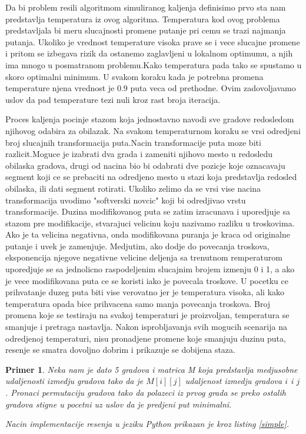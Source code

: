 \documentclass[a4paper]{article}
\newtheorem{primer}{Primer}[section]
\begin{document}
Da bi problem resili algoritmom simuliranog kaljenja definisimo prvo sta nam predstavlja temperatura iz ovog algoritma. Temperatura kod ovog problema predstavljala bi meru slucajnosti promene putanje pri cemu se trazi najmanja putanja. Ukoliko je vrednost temperature visoka prave se i vece slucajne promene i pritom se izbegava rizik da ostanemo zaglavljeni u lokalnom optimumu, a njih ima mnogo u posmatranom problemu.Kako temperatura pada tako se spustamo u skoro optimalni minimum. U svakom koraku kada je potrebna promena temperature njena vrednost je 0.9 puta veca od prethodne. Ovim zadovoljavamo uslov da pad temperature tezi nuli kroz rast broja iteracija.\par

Proces kaljenja pocinje stazom koja jednostavno navodi sve gradove redosledom njihovog odabira za obilazak. Na svakom temperaturnom koraku se vrsi odredjeni broj slucajnih transformacija puta.Nacin transformacije puta moze biti razlicit.Moguce je izabrati dva grada i zameniti njihovo mesto u redosledu obilaska gradova, drugi od nacina bio bi odabrati dve pozicje koje oznacavaju segment koji ce se prebaciti na odredjeno mesto u stazi koja predstavlja redosled obilaska, ili dati segment rotirati. Ukoliko zelimo da se vrsi vise nacina transformacija uvodimo "softverski novcic" koji bi odredjivao vrstu transformacije. 
 Duzina modifikovanog puta se zatim izracunava i uporedjuje sa stazom pre modifikacije, stvarajuci velicinu koju nazivamo razliku u troskovima. Ako je ta velicina negativna, onda modifikovana puranja je kraca od originalne putanje i uvek je zamenjuje. Medjutim, ako dodje do povecanja troskova, eksponencija njegove negativne velicine deljenja sa trenutnom remperaturom uporedjuje se sa jednolicno raspodeljenim slucajnim brojem izmenju 0 i 1, a ako je vece modifikovana puta ce se koristi iako je povecala troskove. U pocetku ce prihvatanje duzeg puta biti vise verovatno jer je temperatura visoka, ali kako temperatura opada bice prihvacena samo manja povecanja troskova. Broj promena koje se testiraju na svakoj temperaturi je proizvoljan, temperatura se smanjuje i pretraga nastavlja. Nakon isprobljavanja svih mogucih scenarija na odredjenoj temperaturi, nisu pronadjene promene koje smanjuju duzinu puta, resenje se smatra dovoljno dobrim i prikazuje se dobijena staza.

\begin{primer}
Neka nam je dato 5 gradova i matrica M koja predstavlja medjusobne udaljenosti izmedju gradova tako da je $M[i][j]$ udaljenost izmedju gradova $i$ i $j$. Pronaci permutaciju gradova tako da polazeci iz prvog grada se preko ostalih gradova stigne u pocetni uz uslov da je predjeni put minimalni.\par
Nacin implementacije resenja u jeziku Python prikazan je kroz listing \ref{simple}. 
\end{primer}
\end{document}
